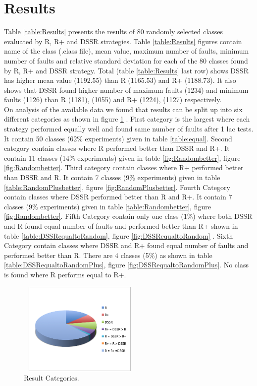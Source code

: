 \documentclass[conference]{IEEEtran}
\begin{document}

\section{Results}\label{sec:res}

Table \ref{table:Results} presents the results of 80 randomly selected classes evaluated by R, R+ and DSSR strategies. Table \ref{table:Results} figures contain name of the class (.class file), mean value, maximum number of faults, minimum number of faults and relative standard deviation for each of the 80 classes found by R, R+ and DSSR strategy. Total (table \ref{table:Results} last row) shows DSSR has higher mean value (1192.55) than R (1165.53) and R+ (1188.73). It also shows that DSSR found higher number of maximum faults (1234) and minimum faults (1126) than R (1181), (1055) and R+ (1224), (1127) respectively.\\

On analysis of the available data we found that results can be split up into six different categories as shown in figure \ref{fig:pie} . First category is the largest where each strategy performed equally well and found same number of faults after 1 lac tests. It contain 50 classes (62\% experiments) given in table \ref{table:equal}. Second category contain classes where R performed better than DSSR and R+. It contain 11 classes (14\% experiments) given in table \ref{fig:Randombetter}, figure \ref{fig:Randombetter}. Third category contain classes where R+ performed better than DSSR and R. It contain 7 classes (9\% experiments) given in table \ref{table:RandomPlusbetter}, figure \ref{fig:RandomPlusbetter}. Fourth Category contain classes where DSSR performed better than R and R+. It contain 7 classes (9\% experiments) given in table \ref{table:Randombetter}, figure \ref{fig:Randombetter}. Fifth Category contain only one class (1\%) where both DSSR and R found equal number of faults and performed better than R+ shown in table \ref{table:DSSRequaltoRandom}, figure \ref{fig:DSSRequaltoRandom} . Sixth Category contain classes where DSSR and R+ found equal number of faults and performed better than R. There are 4 classes (5\%) as shown in table \ref{table:DSSRequaltoRandomPlus}, figure \ref{fig:DSSRequaltoRandomPlus}. No class is found where R performs equal to R+.\\ 


\begin{figure}[ht]
\centering
\includegraphics[width=6cm,height=4.5cm]{pie1.png}
\caption{Result Categories.}
\label{fig:pie}
\end{figure}
\end{document}
